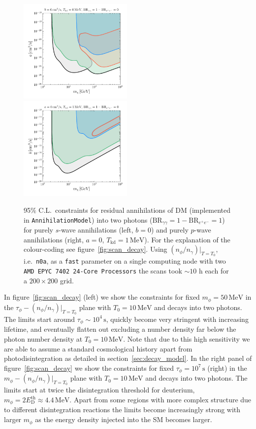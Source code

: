 \documentclass[11pt,a4paper]{article}
\begin{document}
\begin{figure}
	\centering
	\includegraphics[width=0.495\textwidth]{plots/annih_swave.pdf}
	\includegraphics[width=0.495\textwidth]{plots/annih_pwave_1MeV.pdf}
	\caption{95\% C.L.\ constraints for residual annihilations of DM (implemented in \texttt{AnnihilationModel}) into two photons ($\text{BR}_{\gamma \gamma} = 1 - \text{BR}_{e^+ e^-} = 1$) for purely $s$-wave annihilations (left, $b = 0$) and purely $p$-wave annihilations (right, $a = 0$, $T_\mathrm{kd} = 1 \, \mathrm{MeV}$). For the explanation of the colour-coding see figure~\ref{fig:scan_decay}. Using $(n_\phi/n_\gamma)|_{T=T_0}$, i.e.\ \texttt{n0a}, as a \texttt{fast} parameter on a single computing node with two \texttt{AMD EPYC 7402 24-Core Processors} the scans took $\sim 10$ h each for a $200 \times 200$ grid.}
	\label{fig:scan_annih}
\end{figure}

In figure~\ref{fig:scan_decay} (left) we show the constraints for fixed $m_\phi = 50 \, \mathrm{MeV}$ in the $\tau_\phi - (n_\phi/n_\gamma)|_{T=T_0}$ plane with $T_0 = 10 \, \mathrm{MeV}$ and decays into two photons. The limits start around $\tau_\phi \sim 10^4 \, \mathrm{s}$, quickly become very stringent with increasing lifetime, and eventually flatten out excluding a number density far below the photon number density at $T_0 = 10 \, \mathrm{MeV}$. Note that due to this high sensitivity we are able to assume a standard cosmological history apart from photodisintegration as detailed in section~\ref{sec:decay_model}.
In the right panel of figure~\ref{fig:scan_decay} we show the constraints for fixed $\tau_\phi = 10^7 \, \mathrm{s}$ (right) in the $m_\phi - (n_\phi/n_\gamma)|_{T=T_0}$ plane with $T_0 = 10 \, \mathrm{MeV}$ and decays into two photons. The limits start at twice the disintegration threshold for deuterium, $m_\phi = 2 E_\mathrm{D}^\mathrm{th} \approx 4.4 \, \mathrm{MeV}$. Apart from some regions with more complex structure due to different disintegration reactions the limits become increasingly strong with larger $m_\phi$ as the energy density injected into the SM becomes larger.
\end{document}
